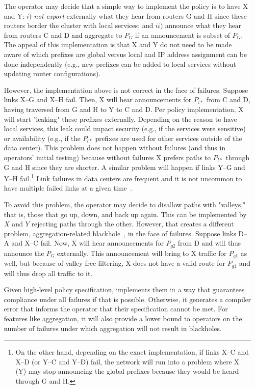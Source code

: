 The operator may decide that a simple way to implement the policy is to have X and Y: $i)$ {\em not export} externally what they hear from routers G and H since these routers border the cluster with local services; and $ii)$ announce what they hear from routers C and D and aggregate to $P_G$ if an announcement is subset of $P_G$. The appeal of this implementation is that X and Y do not need to be made aware of which prefixes are global versus local and IP address assignment can be done independently (e.g., new prefixes can be added to local services without updating router configurations).

However, the implementation above is not correct in the face of failures. Suppose links X--G and X--H fail. Then, X will hear announcements for $P_{l*}$ from C and D, having traversed from G and H to Y to C and D. Per policy implementation, X will start "leaking" these prefixes externally. Depending on the reason to have local services, this leak could impact security (e.g., if the services were sensitive) or availability (e.g., if the $P_{l*}$ prefixes are used for other services outside of the data center). This problem does not happen without failures (and thus in operators' initial testing) because without failures X prefers paths to $P_{l*}$ through G and H since they are shorter. A similar problem will happen if links Y--G and Y--H fail.\footnote{On the other hand, depending on the exact implementation, if links X--C and X--D (or Y--C and Y--D) fail, the network will run into a problem where X (Y) may stop announcing the global prefixes because they would be heard through G and H.}  Link failures in data centers are frequent and it is not uncommon to have multiple failed links at a given time~\cite{dc-failure-study}.

To avoid this problem, the operator may decide to disallow paths with "valleys," that is, those that go up, down, and back up again. This can be implemented by $X$ and $Y$ rejecting paths through the other. However, that creates a different problem, aggregation-related blackhole~\cite{xx}, in the face of failures. Suppose links D--A and X--C fail. Now, X will hear announcements for $P_{g2}$ from D and will thus announce the $P_G$ externally. This announcement will bring to X traffic for $P_{g1}$ as well, but because of valley-free filtering, X does not have a valid route for $P_{g1}$ and will thus drop all traffic to it.

Given high-level policy specification, \sysname implements them in a way that guarantees compliance under all failures if that is possible. Otherwise, it generates a compiler error that informs the operator that their specification cannot be met. For features like aggregation, it will also provide a lower bound to operators on the number of failures under which aggregation will not result in blackholes.


